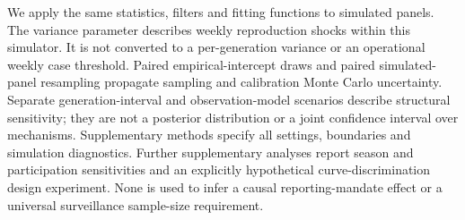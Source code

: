 We apply the same statistics, filters and fitting functions to simulated panels. The variance parameter describes weekly reproduction shocks within this simulator. It is not converted to a per-generation variance or an operational weekly case threshold. Paired empirical-intercept draws and paired simulated-panel resampling propagate sampling and calibration Monte Carlo uncertainty. Separate generation-interval and observation-model scenarios describe structural sensitivity; they are not a posterior distribution or a joint confidence interval over mechanisms. Supplementary methods specify all settings, boundaries and simulation diagnostics. Further supplementary analyses report season and participation sensitivities and an explicitly hypothetical curve-discrimination design experiment. None is used to infer a causal reporting-mandate effect or a universal surveillance sample-size requirement.
